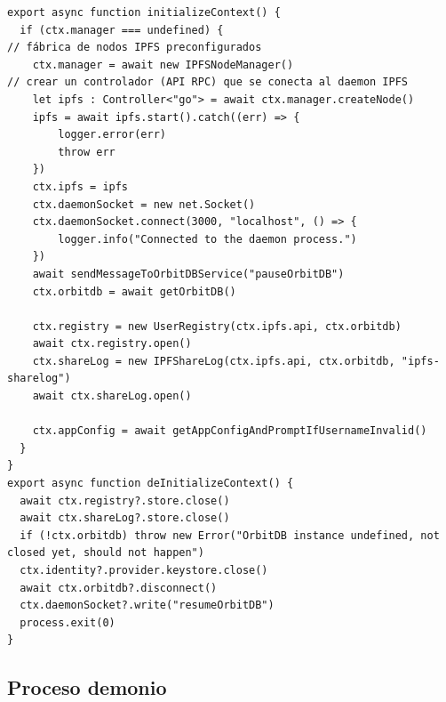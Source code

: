 \begin{verbatim}
export async function initializeContext() {
  if (ctx.manager === undefined) {
// fábrica de nodos IPFS preconfigurados
    ctx.manager = await new IPFSNodeManager()
// crear un controlador (API RPC) que se conecta al daemon IPFS
    let ipfs : Controller<"go"> = await ctx.manager.createNode()
    ipfs = await ipfs.start().catch((err) => {
        logger.error(err)
        throw err
    })
    ctx.ipfs = ipfs
    ctx.daemonSocket = new net.Socket()
    ctx.daemonSocket.connect(3000, "localhost", () => {
        logger.info("Connected to the daemon process.") 
    })
    await sendMessageToOrbitDBService("pauseOrbitDB")
    ctx.orbitdb = await getOrbitDB()
    
    ctx.registry = new UserRegistry(ctx.ipfs.api, ctx.orbitdb)
    await ctx.registry.open()
    ctx.shareLog = new IPFShareLog(ctx.ipfs.api, ctx.orbitdb, "ipfs-sharelog")
    await ctx.shareLog.open()
    
    ctx.appConfig = await getAppConfigAndPromptIfUsernameInvalid()
  }
}
export async function deInitializeContext() {
  await ctx.registry?.store.close()
  await ctx.shareLog?.store.close()
  if (!ctx.orbitdb) throw new Error("OrbitDB instance undefined, not closed yet, should not happen")
  ctx.identity?.provider.keystore.close()
  await ctx.orbitdb?.disconnect()
  ctx.daemonSocket?.write("resumeOrbitDB")
  process.exit(0)
}
\end{verbatim}

\subsection{Proceso demonio}


